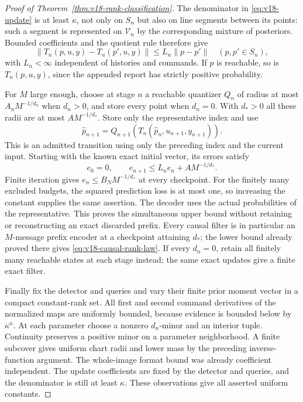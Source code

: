 \documentclass[11pt]{amsart}
\theoremstyle{definition}\newtheorem{definition}[theorem]{Definition}
\theoremstyle{remark}\newtheorem{remark}[theorem]{Remark}
\begin{document}
\begin{proof}[Proof of Theorem~\ref{thm:v18-rank-classification}]
The denominator in \eqref{eq:v18-update} is at least $\kappa$, not only
on $S_n$ but also on line segments between its points: such a segment
is represented on $\mathscr V_n$ by the corresponding mixture of
posteriors. Bounded coefficients and the quotient rule therefore give
\[
 \|T_n(p,u,y)-T_n(p',u,y)\|\le L_n\|p-p'\|
 \quad(p,p'\in S_n),
\]
with $L_n<\infty$ independent of histories and commands. If $p$ is
reachable, so is $T_n(p,u,y)$, since the appended report has strictly
positive probability.

For $M$ large enough, choose at stage $n$ a reachable quantizer $Q_n$
of radius at most $A_nM^{-1/d_n}$ when $d_n>0$, and store every point
when $d_n=0$. With $d_* >0$ all these radii are at most
$AM^{-1/d_*}$. Store only the representative index and use
\[
 \widehat p_{n+1}=Q_{n+1}(T_n(\widehat p_n,u_{n+1},y_{n+1})).
\]
This is an admitted transition using only the preceding index and the
current input. Starting with the known exact initial vector, its errors
satisfy
\[
 e_0=0,\qquad e_{n+1}\le L_ne_n+AM^{-1/d_*}.
\]
Finite iteration gives $e_n\le B_NM^{-1/d_*}$ at every checkpoint.
For the finitely many excluded budgets, the squared prediction loss is
at most one, so increasing the constant supplies the same assertion.
The decoder uses the actual probabilities of the representative. This
proves the simultaneous upper bound without retaining or reconstructing
an exact discarded prefix. Every causal filter is in particular an
$M$-message prefix encoder at a checkpoint attaining $d_*$; the lower
bound already proved there gives \eqref{eq:v18-causal-rank-law}.
If every $d_n=0$, retain all finitely many reachable states at each
stage instead; the same exact updates give a finite exact filter.

Finally fix the detector and queries and vary their finite prior moment
vector in a compact constant-rank set. All first and second command
derivatives of the normalized maps are uniformly bounded, because
evidence is bounded below by $\kappa^n$. At each parameter choose a
nonzero $d_n$-minor and an interior tuple. Continuity preserves a
positive minor on a parameter neighborhood. A finite subcover gives
uniform chart radii and lower mass by the preceding inverse-function
argument. The whole-image format bound was already coefficient
independent. The update coefficients are fixed by the detector and
queries, and the denominator is still at least $\kappa$. These
observations give all asserted uniform constants.
\end{proof}
\end{document}
